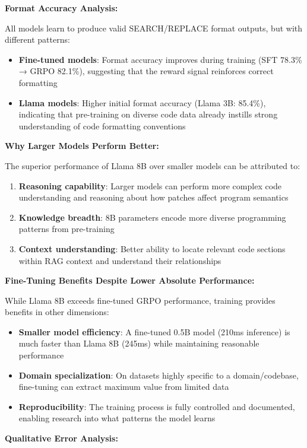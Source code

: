 \documentclass{article} %
\begin{document}
\noindent\textbf{Format Accuracy Analysis:}

All models learn to produce valid SEARCH/REPLACE format outputs, but with different patterns:
\begin{itemize}
    \item \textbf{Fine-tuned models}: Format accuracy improves during training (SFT 78.3\% → GRPO 82.1\%), suggesting that the reward signal reinforces correct formatting
    \item \textbf{Llama models}: Higher initial format accuracy (Llama 3B: 85.4\%), indicating that pre-training on diverse code data already instills strong understanding of code formatting conventions
\end{itemize}

\noindent\textbf{Why Larger Models Perform Better:}

The superior performance of Llama 8B over smaller models can be attributed to:
\begin{enumerate}
    \item \textbf{Reasoning capability}: Larger models can perform more complex code understanding and reasoning about how patches affect program semantics
    \item \textbf{Knowledge breadth}: 8B parameters encode more diverse programming patterns from pre-training
    \item \textbf{Context understanding}: Better ability to locate relevant code sections within RAG context and understand their relationships
\end{enumerate}

\noindent\textbf{Fine-Tuning Benefits Despite Lower Absolute Performance:}

While Llama 8B exceeds fine-tuned GRPO performance, training provides benefits in other dimensions:
\begin{itemize}
    \item \textbf{Smaller model efficiency}: A fine-tuned 0.5B model (210ms inference) is much faster than Llama 8B (245ms) while maintaining reasonable performance
    \item \textbf{Domain specialization}: On datasets highly specific to a domain/codebase, fine-tuning can extract maximum value from limited data
    \item \textbf{Reproducibility}: The training process is fully controlled and documented, enabling research into what patterns the model learns
\end{itemize}

\noindent\textbf{Qualitative Error Analysis:}
\end{document}
